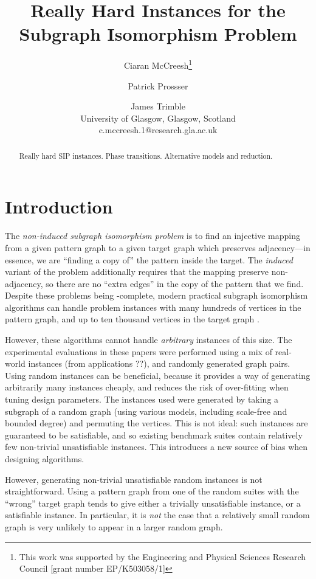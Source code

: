 \documentclass[letterpaper]{article}
\title{Really Hard Instances for the Subgraph Isomorphism Problem}
\author{Ciaran McCreesh\thanks{This work was supported by the Engineering and Physical Sciences
    Research Council [grant number EP/K503058/1]} \and Patrick Prossser \and James Trimble \\
University of Glasgow, Glasgow, Scotland \\
c.mccreesh.1@research.gla.ac.uk}
\begin{document}
\maketitle

\begin{abstract}
    Really hard SIP instances. Phase transitions. Alternative models and reduction.
\end{abstract}

\section{Introduction}

The \emph{non-induced subgraph isomorphism problem} is to find an injective mapping from a given
pattern graph to a given target graph which preserves adjacency---in essence, we are ``finding a
copy of'' the pattern inside the target. The \emph{induced} variant of the problem additionally
requires that the mapping preserve non-adjacency, so there are no ``extra edges'' in the copy of the
pattern that we find. Despite these problems being \NP-complete, modern practical subgraph
isomorphism algorithms can handle problem instances with many hundreds of vertices in the pattern
graph, and up to ten thousand vertices in the target graph
\cite{Cordella:2004,Solnon:2010,Audemard:2014,McCreesh:2015}.

However, these algorithms cannot handle \emph{arbitrary} instances of this size. The experimental
evaluations in these papers were performed using a mix of real-world instances (from applications
??), and randomly generated graph pairs. Using random instances can be beneficial, because it
provides a way of generating arbitrarily many instances cheaply, and reduces the risk of
over-fitting when tuning design parameters. The instances used were generated by taking a subgraph
of a random graph (using various models, including scale-free and bounded degree) and permuting the
vertices.  This is not ideal: such instances are guaranteed to be satisfiable, and so existing
benchmark suites contain relatively few non-trivial unsatisfiable instances. This introduces a new
source of bias when designing algorithms.

However, generating non-trivial unsatisfiable random instances is not straightforward. Using a
pattern graph from one of the random suites with the ``wrong'' target graph tends to give either a
trivially unsatisfiable instance, or a satisfiable instance. In particular, it is \emph{not} the
case that a relatively small random graph is very unlikely to appear in a larger random graph.
\end{document}
